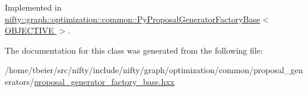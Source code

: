 Implemented in \hyperlink{classnifty_1_1graph_1_1optimization_1_1common_1_1PyProposalGeneratorFactoryBase_a27a9951d4cbf17168efb32a2d1416da3}{nifty\+::graph\+::optimization\+::common\+::\+Py\+Proposal\+Generator\+Factory\+Base$<$ O\+B\+J\+E\+C\+T\+I\+V\+E $>$}.



The documentation for this class was generated from the following file\+:\begin{DoxyCompactItemize}
\item 
/home/tbeier/src/nifty/include/nifty/graph/optimization/common/proposal\+\_\+generators/\hyperlink{common_2proposal__generators_2proposal__generator__factory__base_8hxx}{proposal\+\_\+generator\+\_\+factory\+\_\+base.\+hxx}\end{DoxyCompactItemize}
